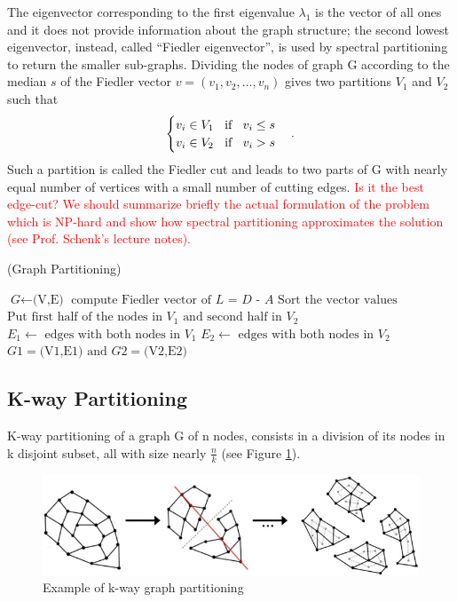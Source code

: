 \documentclass[]{usiinfbachelorproject}
\begin{document}
The eigenvector corresponding to the first eigenvalue $\lambda_1$ is the vector of all ones and it does not provide information about the graph structure; the second lowest eigenvector, instead, called ``Fiedler eigenvector'', is used by spectral partitioning to return the smaller sub-graphs. Dividing the nodes of graph G according to the median $s$ of the Fiedler vector $v = (v_1,v_2,...,v_n)$ gives two partitions $V_1$ and $V_2$ such that
\begin{equation}\notag
\begin{cases}
v_i \in V_1 \text{\;\; if \;\;} v_i \leq s \\
v_i \in V_2 \text{\;\; if \;\;} v_i > s
\end{cases} .
\end{equation}
Such a partition is called the Fiedler cut and leads to two parts of G with nearly equal number of vertices with a small number of cutting edges. \textcolor{red}{Is it the best edge-cut? We should summarize briefly the actual formulation of the problem which is NP-hard and show how spectral partitioning approximates the solution (see Prof. Schenk's lecture notes).}

\begin{algorithm}
\caption{ (Graph Partitioning)}\label{gpartitioning}
\begin{algorithmic}[1]
\State $\textit{G} \gets \text{(V,E)}$
\State $\text{compute Fiedler vector of } \textit{L = D - A}$
\State $\text{Sort the vector values}$
\State $\text{Put first half of the nodes in } V_1 \text{ and second half in } V_2$
\State $ E_1 \gets \text{ edges with both nodes in } V_1$
\State $ E_2 \gets \text{ edges with both nodes in } V_2$\\
\Return $\textit{G1} = \text{(V1,E1) and } \textit{G2} = \text{(V2,E2)}$
\EndProcedure
\end{algorithmic}
\end{algorithm}



\subsection{K-way Partitioning}
K-way partitioning of a graph G of n nodes, consists in a division of its nodes in k disjoint subset, all with size nearly $\frac{n}{k}$ (see Figure \ref{fig:kpartitioning}).

\begin{figure}[ht]
	\centering
	\includegraphics[height=3cm]{img/k_way_partitioning.jpg}
	\caption{Example of k-way graph partitioning}
	\label{fig:kpartitioning}
\end{figure}
\end{document}
